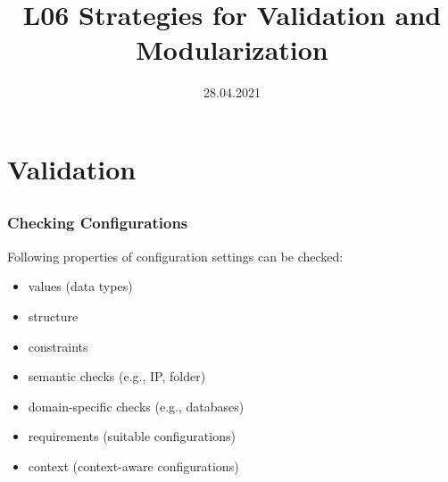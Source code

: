 

\title{L06 Strategies for Validation and Modularization}
\date{28.04.2021}




\section{Validation}
\subsection{}

\begin{frame}
	\frametitle{Checking Configurations}

	Following properties of configuration settings can be checked:

	\begin{itemize}[<+-| alert@+>]
	\item values (data types)
	\item structure
	\item constraints
	\item semantic checks (e.g., IP, folder)
	\item domain-specific checks (e.g., databases)
	\item requirements (suitable configurations)
	\item context (context-aware configurations)
	\end{itemize}
\end{frame}

